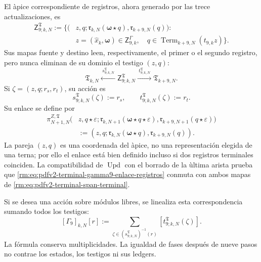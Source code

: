 El \`apice correspondiente de registros, ahora generado por las trece
actualizaciones, es
\begin{equation}
\label{rm:eq:pdfv2-terminal-apice-terminal-gamma9}
 \begin{split}
 \mathsf Z^{\mathfrak T}_{9;k,N}:=\bigl\{
 (&z,q;
   \mathfrak r_{k,N}(\boldsymbol\omega\star q),
   \mathfrak r_{k+9,N}(q)):\\
 &z=(\widehat x_k,\boldsymbol\omega)\in
       \mathsf Z^\Gamma_{9,k},\quad
 q\in\operatorname{Term}_{k+9,N}(t_{9,k}z)
 \bigr\}.
 \end{split}
\end{equation}
Sus mapas fuente y destino leen, respectivamente, el primer o el segundo
registro, pero nunca eliminan de su dominio el testigo \((z,q)\):
\begin{equation}
\label{rm:eq:pdfv2-terminal-span-terminal}
 \mathfrak T_{k,N}
 \xleftarrow{\ s^{\mathfrak T}_{9;k,N}\ }
 \mathsf Z^{\mathfrak T}_{9;k,N}
 \xrightarrow{\ t^{\mathfrak T}_{9;k,N}\ }
 \mathfrak T_{k+9,N}.
\end{equation}
Si \(\zeta=(z,q;r_s,r_t)\), su acción es
\begin{equation}
\label{rm:eq:pdfv2-terminal-span-terminal-accion}
 s^{\mathfrak T}_{9;k,N}(\zeta):=r_s,
 \qquad
 t^{\mathfrak T}_{9;k,N}(\zeta):=r_t.
\end{equation}
Su enlace se define por
\begin{equation}
\label{rm:eq:pdfv2-terminal-gamma9-enlace-registros}
 \begin{split}
 \pi^{Z,\mathfrak T}_{N+1,N}
 \bigl(&z,q\star\varepsilon;
       \mathfrak r_{k,N+1}
          (\boldsymbol\omega\star q\star\varepsilon),
       \mathfrak r_{k+9,N+1}(q\star\varepsilon)\bigr)\\
 &:=(z,q;\mathfrak r_{k,N}(\boldsymbol\omega\star q),
       \mathfrak r_{k+9,N}(q)).
 \end{split}
\end{equation}
La pareja \((z,q)\) es una coordenada del \`apice, no una representación
elegida de una terna; por ello el enlace está bien definido incluso si dos
registros terminales coinciden. La compatibilidad de
\(\operatorname{Upd}\) con el borrado de la \`ultima arista prueba que
\eqref{rm:eq:pdfv2-terminal-gamma9-enlace-registros} conmuta con ambos mapas de
\eqref{rm:eq:pdfv2-terminal-span-terminal}.

Si se desea una acci\'on sobre m\'odulos libres, se linealiza esta
correspondencia sumando todos los testigos:
\begin{equation}
\label{rm:eq:pdfv2-terminal-linealizacion-span}
 [\Gamma_9]_{k,N}[r]
 :=\sum_{\zeta\in(s^{\mathfrak T}_{9;k,N})^{-1}(r)}
 [t^{\mathfrak T}_{9;k,N}(\zeta)].
\end{equation}
La f\'ormula conserva multiplicidades. La igualdad de fases despu\'es de
nueve pasos no contrae los estados, los testigos ni sus ledgers.

